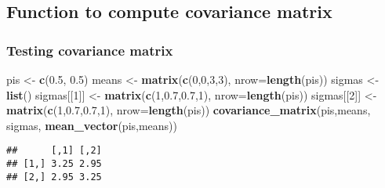 \documentclass[]{article}
\newenvironment{Shaded}{\begin{snugshade}}{\end{snugshade}}
\newcommand{\ControlFlowTok}[1]{\textcolor[rgb]{0.13,0.29,0.53}{\textbf{#1}}}
\newcommand{\DataTypeTok}[1]{\textcolor[rgb]{0.13,0.29,0.53}{#1}}
\newcommand{\DecValTok}[1]{\textcolor[rgb]{0.00,0.00,0.81}{#1}}
\newcommand{\FloatTok}[1]{\textcolor[rgb]{0.00,0.00,0.81}{#1}}
\newcommand{\KeywordTok}[1]{\textcolor[rgb]{0.13,0.29,0.53}{\textbf{#1}}}
\newcommand{\NormalTok}[1]{#1}
\newcommand{\OperatorTok}[1]{\textcolor[rgb]{0.81,0.36,0.00}{\textbf{#1}}}
\newcommand{\StringTok}[1]{\textcolor[rgb]{0.31,0.60,0.02}{#1}}
\begin{document}
\hypertarget{function-to-compute-covariance-matrix}{%
\subsection{Function to compute covariance
matrix}\label{function-to-compute-covariance-matrix}}

\begin{Shaded}
\end{Shaded}

\hypertarget{testing-covariance-matrix}{%
\subsubsection{Testing covariance
matrix}\label{testing-covariance-matrix}}

\begin{Shaded}
\begin{Highlighting}[]
\NormalTok{pis <-}\StringTok{ }\KeywordTok{c}\NormalTok{(}\FloatTok{0.5}\NormalTok{, }\FloatTok{0.5}\NormalTok{)}
\NormalTok{means <-}\StringTok{ }\KeywordTok{matrix}\NormalTok{(}\KeywordTok{c}\NormalTok{(}\DecValTok{0}\NormalTok{,}\DecValTok{0}\NormalTok{,}\DecValTok{3}\NormalTok{,}\DecValTok{3}\NormalTok{), }\DataTypeTok{nrow=}\KeywordTok{length}\NormalTok{(pis))}
\NormalTok{sigmas <-}\StringTok{ }\KeywordTok{list}\NormalTok{()}
\NormalTok{sigmas[[}\DecValTok{1}\NormalTok{]] <-}\StringTok{ }\KeywordTok{matrix}\NormalTok{(}\KeywordTok{c}\NormalTok{(}\DecValTok{1}\NormalTok{,}\FloatTok{0.7}\NormalTok{,}\FloatTok{0.7}\NormalTok{,}\DecValTok{1}\NormalTok{), }\DataTypeTok{nrow=}\KeywordTok{length}\NormalTok{(pis))}
\NormalTok{sigmas[[}\DecValTok{2}\NormalTok{]] <-}\StringTok{ }\KeywordTok{matrix}\NormalTok{(}\KeywordTok{c}\NormalTok{(}\DecValTok{1}\NormalTok{,}\FloatTok{0.7}\NormalTok{,}\FloatTok{0.7}\NormalTok{,}\DecValTok{1}\NormalTok{), }\DataTypeTok{nrow=}\KeywordTok{length}\NormalTok{(pis))}
\KeywordTok{covariance_matrix}\NormalTok{(pis,means, sigmas, }\KeywordTok{mean_vector}\NormalTok{(pis,means))}
\end{Highlighting}
\end{Shaded}

\begin{verbatim}
##      [,1] [,2]
## [1,] 3.25 2.95
## [2,] 2.95 3.25
\end{verbatim}
\end{document}

